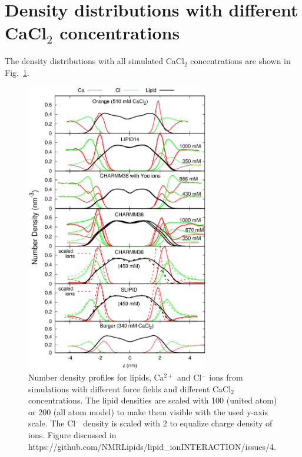 \documentclass[pre,aps,floatfix,authordate1-4,twocolumn]{revtex4-1}
\begin{document}
\section{Density distributions with different CaCl$_2$ concentrations}

The density distributions with all simulated CaCl$_2$ concentrations are shown in Fig.~\ref{CAdensities}.
\begin{figure}[]
  \centering
  \includegraphics[width=8cm]{../Fig/CAdensities.eps}
  \caption{\label{CAdensities}
    Number density profiles for lipids, Ca$^{2+}$ and Cl$^-$ ions from simulations with different force fields 
    and different CaCl$_2$ concentrations. 
    The lipid densities are scaled with 100 (united atom) or 200 (all atom model) to make them visible with the used y-axis scale.
    The Cl$^-$ density is scaled with 2 to equalize charge density of ions.
    Figure discussed in https://github.com/NMRLipids/lipid\_ionINTERACTION/issues/4.
  }
\end{figure}
\end{document}
